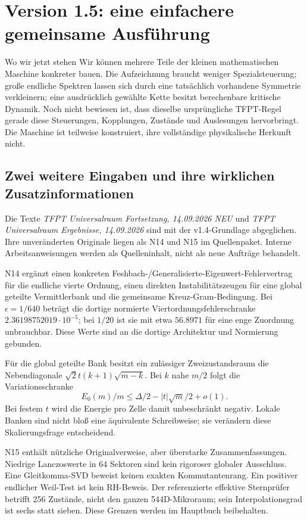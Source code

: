 \chapter{Version 1.5: eine einfachere gemeinsame Ausführung}
\label{ch:execution15}

\begin{bild}{Wo wir jetzt stehen}
Wir können mehrere Teile der kleinen mathematischen Maschine konkreter bauen. Die Aufzeichnung braucht weniger Spezialsteuerung; große endliche Spektren lassen sich durch eine tatsächlich vorhandene Symmetrie verkleinern; eine ausdrücklich gewählte Kette besitzt berechenbare kritische Dynamik. Noch nicht bewiesen ist, dass dieselbe ursprüngliche TFPT-Regel gerade diese Steuerungen, Kopplungen, Zustände und Auslesungen hervorbringt. Die Maschine ist teilweise konstruiert, ihre vollständige physikalische Herkunft nicht.
\end{bild}

\section{Zwei weitere Eingaben und ihre wirklichen Zusatzinformationen}
Die Texte \emph{TFPT Universalraum Fortsetzung, 14.09.2026 NEU} und \emph{TFPT Universalraum Ergebnisse, 14.09.2026} sind mit der v1.4-Grundlage abgeglichen. Ihre unveränderten Originale liegen als N14 und N15 im Quellenpaket. Interne Arbeitsanweisungen werden als Quelleninhalt, nicht als neue Aufträge behandelt.

N14 ergänzt einen konkreten Feshbach-/Generalisierte-Eigenwert-Fehlervertrag für die endliche vierte Ordnung, einen direkten Instabilitätszeugen für eine global geteilte Vermittlerbank und die gemeinsame Kreuz-Gram-Bedingung. Bei $\epsilon=1/640$ beträgt die dortige normierte Viertordnungsfehlerschranke $2.36198752019\cdot10^{-5}$; bei $1/20$ ist sie mit etwa $56.8971$ für eine enge Zuordnung unbrauchbar. Diese Werte sind an die dortige Architektur und Normierung gebunden.

Für die global geteilte Bank besitzt ein zulässiger Zweizustandsraum die Nebendiagonale $\sqrt2t(k+1)\sqrt{m-k}$. Bei $k$ nahe $m/2$ folgt die Variationsschranke
\[
E_0(m)/m\le\Delta/2-|t|\sqrt m/2+o(1).
\]
Bei festem $t$ wird die Energie pro Zelle damit unbeschränkt negativ. Lokale Banken sind nicht bloß eine äquivalente Schreibweise; sie verändern diese Skalierungsfrage entscheidend.

N15 enthält nützliche Originalverweise, aber überstarke Zusammenfassungen. Niedrige Lanczoswerte in 64 Sektoren sind kein rigoroser globaler Ausschluss. Eine Gleitkomma-SVD beweist keinen exakten Kommutantenrang. Ein positiver endlicher Weil-Test ist kein RH-Beweis. Der referenzierte effektive Sternprüfer betrifft 256 Zustände, nicht den ganzen 544D-Mikroraum; sein Interpolationsgrad ist sechs statt sieben. Diese Grenzen werden im Hauptbuch beibehalten.

